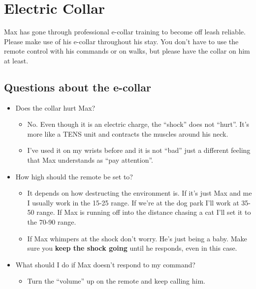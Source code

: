 \documentclass[pdftex,12pt]{article}
\begin{document}
\newpage
\section{Electric Collar} \label{sec:collar}

Max has gone through professional e-collar training to become off leash
reliable. Please make use of his e-collar throughout his stay. You don't have
to use the remote control with his commands or on walks, but please have the
collar on him at least.

\subsection{Questions about the e-collar}

\begin{itemize}
    \item Does the collar hurt Max?
        \begin{itemize}
            \item No. Even though it is an electric charge, the ``shock'' does
                not ``hurt''. It's more like a TENS unit and contracts the
                muscles around his neck.
            \item I've used it on my wrists before and it is not ``bad'' just
                a different feeling that Max understands as ``pay attention''.
        \end{itemize}
    \item How high should the remote be set to?
        \begin{itemize}
            \item It depends on how destructing the environment is. If it's
                just Max and me I usually work in the 15-25 range. If we're at
                the dog park I'll work at 35-50 range. If Max is running off
                into the distance chasing a cat I'll set it to the 70-90
                range.
            \item If Max whimpers at the shock don't worry. He's just being a
                baby. Make sure you \textbf{keep the shock going} until he
                responds, even in this case.
        \end{itemize}
    \item What should I do if Max doesn't respond to my command?
        \begin{itemize}
            \item Turn the ``volume'' up on the remote and keep calling him.
        \end{itemize}
\end{itemize}
\end{document}
